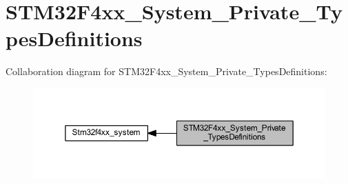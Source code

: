 \hypertarget{group___s_t_m32_f4xx___system___private___types_definitions}{}\section{S\+T\+M32\+F4xx\+\_\+\+System\+\_\+\+Private\+\_\+\+Types\+Definitions}
\label{group___s_t_m32_f4xx___system___private___types_definitions}
Collaboration diagram for S\+T\+M32\+F4xx\+\_\+\+System\+\_\+\+Private\+\_\+\+Types\+Definitions\+:\nopagebreak
\begin{figure}[H]
\begin{center}
\leavevmode
\includegraphics[width=350pt]{group___s_t_m32_f4xx___system___private___types_definitions}
\end{center}
\end{figure}
